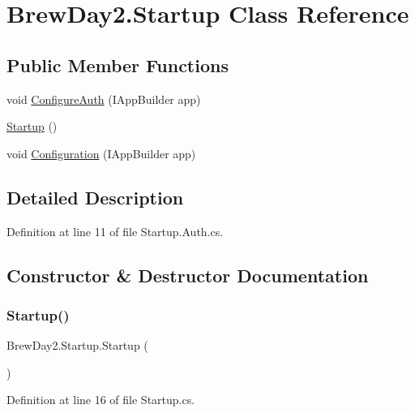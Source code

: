 \hypertarget{class_brew_day2_1_1_startup}{}\section{Brew\+Day2.\+Startup Class Reference}
\label{class_brew_day2_1_1_startup}
\subsection*{Public Member Functions}
\begin{DoxyCompactItemize}
\item 
void \mbox{\hyperlink{class_brew_day2_1_1_startup_a8888284c28425eae2cebe3de8541cbe1}{Configure\+Auth}} (I\+App\+Builder app)
\item 
\mbox{\hyperlink{class_brew_day2_1_1_startup_abe973751eb8df8bc7f740a0df4f07f9f}{Startup}} ()
\item 
void \mbox{\hyperlink{class_brew_day2_1_1_startup_aaee855f3979e32e08654f02e62041b4c}{Configuration}} (I\+App\+Builder app)
\end{DoxyCompactItemize}


\subsection{Detailed Description}


Definition at line 11 of file Startup.\+Auth.\+cs.



\subsection{Constructor \& Destructor Documentation}
\mbox{\label{class_brew_day2_1_1_startup_abe973751eb8df8bc7f740a0df4f07f9f}} 
\subsubsection{\texorpdfstring{Startup()}{Startup()}}
{\footnotesize\ttfamily Brew\+Day2.\+Startup.\+Startup (\begin{DoxyParamCaption}{ }\end{DoxyParamCaption})}



Definition at line 16 of file Startup.\+cs.



